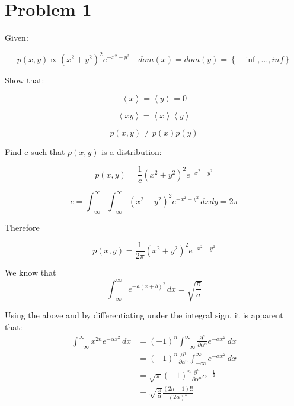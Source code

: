 \documentclass{article}
\begin{document}



\section*{Problem 1}

Given:

\[
p(x,y) \propto (x^2+y^2)^2 e^{-x^2-y^2} \quad dom(x) = dom(y) = \left\{   - \inf, \ldots , inf  \right\} 
\]

Show that:


\[
\left\langle x \right\rangle = \left\langle y \right\rangle = 0 
\]


\[
 \left\langle xy \right\rangle = \left\langle x \right\rangle \left\langle y \right\rangle 
\]


\[
p(x,y) \neq p(x) p(y)
\]







Find c such that $p(x,y)$ is a distribution:

\[
p(x,y) = \frac{1}{c} (x^2+y^2)^2 e^{-x^2-y^2} 
\]

\begin{equation*}    
c = \int _{-\infty }^{\infty } \int _{-\infty }^{\infty } (x^2+y^2)^2  e^{-x^2-y^2} \, dx dy = 2\pi
\end{equation*}

Therefore 


\begin{equation} 
p(x,y) = \frac{1}{2\pi} (x^2+y^2)^2 e^{-x^2-y^2} 
\end{equation}



We know that
\begin{equation}    
\int _{-\infty }^{\infty }e^{-a(x+b)^{2}}\,dx={\sqrt {\frac {\pi }{a}}}
\end{equation}

Using the above and by differentiating under the integral sign, it is apparent that: 
\begin{equation}
    \begin{aligned}
\int _{-\infty }^{\infty }x^{2n}e^{-\alpha x^{2}}\,dx
&=\left(-1\right)^{n}\int _{-\infty }^{\infty }{\frac {\partial ^{n}}{\partial \alpha ^{n}}}e^{-\alpha x^{2}}\,dx\\
&=\left(-1\right)^{n}{\frac {\partial ^{n}}{\partial \alpha ^{n}}}\int _{-\infty }^{\infty }e^{-\alpha x^{2}}\,dx\\[6pt]
&={\sqrt {\pi }}\left(-1\right)^{n}{\frac {\partial ^{n}}{\partial \alpha ^{n}}}\alpha ^{-{\frac {1}{2}}}\\
&={\sqrt {\frac {\pi }{\alpha }}}{\frac {(2n-1)!!}{\left(2\alpha \right)^{n}}}
    \end{aligned}
\end{equation}
\end{document}
